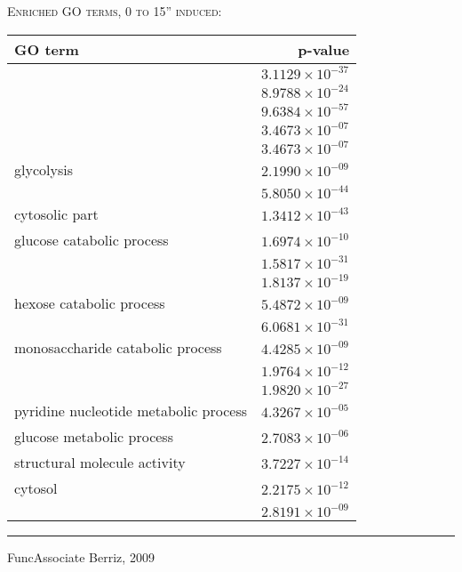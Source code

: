 \documentclass{beamer}
\begin{document}
\begin{frame}
    \textsc{Enriched GO terms, 0 to 15'' induced:}

    \begin{table}[ht]
    \centering
    \scriptsize
        \begin{tabular}{lr}
        \toprule
        \textbf{GO term} & \textbf{p-value}\\ 
        \midrule
        \textbf{\color{blue}{cytosolic large ribosomal subunit}} & $3.1129 \times 10^{-37}$ \\
        \textbf{\color{blue}{cytosolic small ribosomal subunit}} & $8.9788 \times 10^{-24}$ \\
        \textbf{\color{blue}{cytosolic ribosome}} & $9.6384 \times 10^{-57}$ \\
        \textbf{\color{cyan}{rRNA export from nucleus}} & $3.4673 \times 10^{-07}$ \\
        \textbf{\color{cyan}{rRNA transport}} & $3.4673 \times 10^{-07}$ \\
        glycolysis & $2.1990 \times 10^{-09}$ \\
        \textbf{\color{cyan}{cytoplasmic translation}} & $5.8050 \times 10^{-44}$ \\
        cytosolic part & $1.3412 \times 10^{-43}$ \\
        glucose catabolic process & $1.6974 \times 10^{-10}$ \\
        \textbf{\color{blue}{structural constituent of ribosome}} & $1.5817 \times 10^{-31}$ \\
        \textbf{\color{blue}{large ribosomal subunit}} & $1.8137 \times 10^{-19}$ \\
        hexose catabolic process & $5.4872 \times 10^{-09}$ \\
        \textbf{\color{blue}{ribosomal subunit}} & $6.0681 \times 10^{-31}$ \\
        monosaccharide catabolic process & $4.4285 \times 10^{-09}$ \\
        \textbf{\color{blue}{small ribosomal subunit}} & $1.9764 \times 10^{-12}$ \\
        \textbf{\color{blue}{ribosome}} & $1.9820 \times 10^{-27}$ \\
        pyridine nucleotide metabolic process & $4.3267 \times 10^{-05}$ \\
        glucose metabolic process & $2.7083 \times 10^{-06}$ \\
        structural molecule activity & $3.7227 \times 10^{-14}$ \\
        cytosol & $2.2175 \times 10^{-12}$ \\
        \textbf{\color{cyan}{translation}} & $2.8191 \times 10^{-09}$ \\
        \bottomrule
        \end{tabular}
    \end{table}

    \scriptsize
    \rule{\linewidth}{0.5pt}
    {FuncAssociate \hfill Berriz, 2009}
\end{frame}
\end{document}
